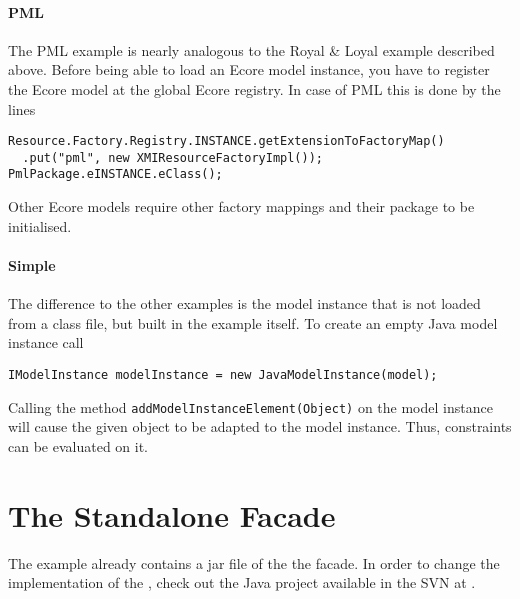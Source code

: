 \paragraph{PML}
The PML example is nearly analogous to the Royal \& Loyal example described 
above. Before being able to load an Ecore model instance, you have to register 
the Ecore model at the global Ecore registry. In case of PML this is done by 
the lines
\lstset{language=Java}
\begin{lstlisting}
Resource.Factory.Registry.INSTANCE.getExtensionToFactoryMap()
  .put("pml", new XMIResourceFactoryImpl());
PmlPackage.eINSTANCE.eClass();
\end{lstlisting}
Other Ecore models require other factory mappings and their package to be 
initialised.

\paragraph{Simple}
The difference to the other examples is the model instance that is not  loaded
from a class file, but built in the example itself. To create an empty Java 
model instance call
\lstset{language=Java}
\begin{lstlisting}
IModelInstance modelInstance = new JavaModelInstance(model);
\end{lstlisting}
Calling the method \lstinline[breaklines=true]{addModelInstanceElement(Object)} 
on the model instance will cause the given object to be adapted to the model 
instance. Thus, constraints can be evaluated on it.



\section{The Standalone Facade}

The example already contains a jar file of the the facade. In order to change 
the implementation of the , check out the Java project 
available in the SVN 
 at .


